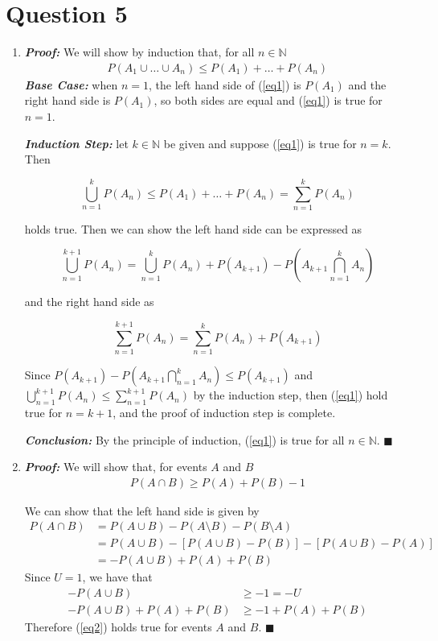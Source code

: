 \documentclass[11pt, oneside]{article}   	%
\newcommand*{\QEDA}{\hfill\ensuremath{\blacksquare}}         %
\begin{document}
\section*{Question 5}
\begin{enumerate}[ (a)]
	\item \textit{\textbf{Proof:}} We will show by induction that, for all $n \in \mathbb{N}$
	\begin{align}
	P(A_1 \cup \ldots \cup A_n) \leq P(A_1) + \ldots + P(A_n)
	\label{eq1}
	\end{align}
	\textit{\textbf{Base Case:}} when $n=1$, the left hand side of (\ref{eq1}) is  $P(A_1)$ and the right hand side is $P(A_1)$, so both sides are equal and (\ref{eq1}) is true for $n=1$.
	
	\textit{\textbf{Induction Step:}} let $k \in \mathbb{N}$ be given and suppose (\ref{eq1}) is true for $n=k$. Then
	
	$$\bigcup_{n=1}^k P(A_n) \leq P(A_1) + \ldots + P(A_n) = \sum_{n=1}^k P(A_n)$$
	
	holds true. Then we can show the left hand side can be expressed as
	
	$$\bigcup_{n=1}^{k+1} P(A_n) = \bigcup_{n=1}^{k} P(A_n) + P(A_{k+1})-P(A_{k+1} \bigcap_{n=1}^{k} A_n)$$
	
	and the right hand side as
	
	$$\sum_{n=1}^{k+1} P(A_n) = \sum_{n=1}^k P(A_n) + P(A_{k+1})$$
	
	Since $P(A_{k+1}) - P(A_{k+1} \bigcap_{n=1}^k A_n) \leq P(A_{k+1})$ and $\bigcup_{n=1}^{k+1} P(A_n) \leq \sum_{n=1}^{k+1} P(A_n)$ by the induction step, then (\ref{eq1}) hold true for $n=k+1$, and the proof of induction step is complete.
	
	\textit{\textbf{Conclusion:}} By the principle of induction, (\ref{eq1}) is true for all $n \in \mathbb{N}$. \QEDA
	
	\item \textit{\textbf{Proof:}} We will show that, for events $A$ and $B$
	\begin{align}
	P(A \cap B) \geq P(A) + P(B) -1
	\label{eq2}
	\end{align}
	
	We can show that the left hand side is given by
	\begin{align*}
	P(A \cap B) & = P(A \cup B) - P(A \setminus B) - P(B \setminus A) \\
	& = P(A \cup B) - [P(A \cup B) - P(B)] - [P(A \cup B) - P(A)] \\
	& = -P(A \cup B) + P(A) + P(B)
	\end{align*}
	Since $U=1$, we have that
	\begin{align*}
	-P(A \cup B) & \geq -1 = -U \\
	-P(A \cup B) + P(A) + P(B) & \geq -1 + P(A) + P(B)
	\end{align*}
	Therefore (\ref{eq2}) holds true for events $A$ and $B$. \QEDA
\end{enumerate}
\end{document}
